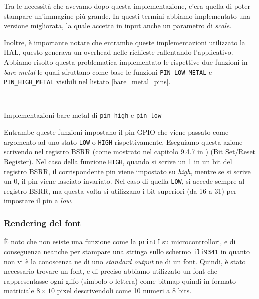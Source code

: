 \documentclass[a4paper]{article}
\begin{document}
Tra le necessità che avevamo dopo questa implementazione, c'era quella di poter stampare
un'immagine più grande. In questi termini abbiamo implementato una versione migliorata,
la quale accetta in input anche un parametro di \textit{scale}.

Inoltre, è importante notare che entrambe queste implementazioni utilizzato la HAL, questo
generava un overhead nelle richieste rallentando l'applicativo. Abbiamo risolto questa
problematica implementato le rispettive due funzioni in \textit{bare metal} le quali
sfruttano come base le funzioni \texttt{PIN\_LOW\_METAL} e \texttt{PIN\_HIGH\_METAL}
visibili nel listato \ref{bare_metal_pins}.

\begin{Listing}
    \centering
    \mbox{
        \quad
    }
    \caption{Implementazioni bare metal di \texttt{pin\_high} e \texttt{pin\_low}}
    \label{bare_metal_pins}
\end{Listing}

Entrambe queste funzioni impostano il pin GPIO che viene passato come argomento ad
uno stato \texttt{LOW} o \texttt{HIGH} rispettivamente.  Eseguiamo questa azione scrivendo
nel registro BSRR (come mostrato nel capitolo 9.4.7 in \cite{STM32F334xx}) (Bit Set/Reset Register).
Nel caso della funzione \texttt{HIGH}, quando si scrive un 1 in un bit del registro BSRR,
il corrispondente pin viene impostato su \textit{high}, mentre se si scrive un 0, il pin viene
lasciato invariato. Nel caso di quella \texttt{LOW}, si accede sempre al registro BSRR,
ma questa volta si utilizzano i bit superiori (da 16 a 31) per impostare il pin a \textit{low}.

\subsubsection{Rendering del font}

È noto che non esiste una funzione come la \texttt{printf} su microcontrollori, e di conseguenza
neanche per stampare una stringa sullo schermo \texttt{ili9341} in quanto non vi è la conoscenza
ne di uno \textit{standard output} ne di un font. Quindi, è stato necessario trovare un font,
e di preciso abbiamo utilizzato un font che rappresentasse ogni glifo (simbolo o lettera) come
bitmap quindi in formato matriciale $8 \times 10$ pixel descrivendoli come 10 numeri a 8 bits.
\end{document}
